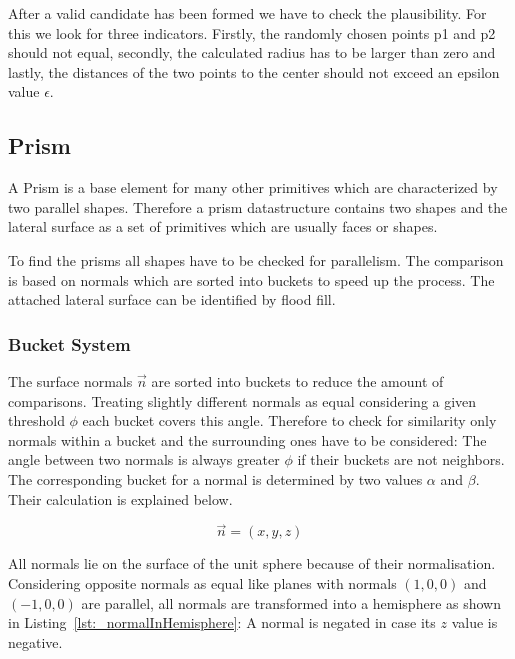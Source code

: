 \documentclass[../ClassicThesis.tex]{subfiles}
\begin{document}
After a valid candidate has been formed we have to check the plausibility. For this we look for three indicators. Firstly, the randomly chosen points p1 and p2 should not equal, secondly, the calculated radius has to be larger than zero and lastly, the distances of the two points to the center should not exceed an epsilon value $\epsilon$.




\subsection{Prism}
\label{ch:classifiers-prism}

A Prism is a base element for many other primitives which are characterized by two parallel shapes. Therefore a prism datastructure contains two shapes and the lateral surface as a set of primitives which are usually faces or shapes.

To find the prisms all shapes have to be checked for parallelism. The comparison is based on normals which are sorted into buckets to speed up the process. The attached lateral surface can be identified by flood fill.

\subsubsection{Bucket System}
\label{sec:PrismBucketSystem}

The surface normals $\vec{n}$ are sorted into buckets to reduce the amount of comparisons. Treating slightly different normals as equal considering a given threshold $\phi$ each bucket covers this angle. Therefore to check for similarity only normals within a bucket and the surrounding ones have to be considered: The angle between two normals is always greater $\phi$ if their buckets are not neighbors. The corresponding bucket for a normal is determined by two values $\alpha$ and $\beta$. Their calculation is explained below.

\begin{equation*}
    \vec{n} = (x, y, z)
\end{equation*}


All normals lie on the surface of the unit sphere because of their normalisation. Considering opposite normals as equal like planes with normals $(1,0,0)$ and $(-1,0,0)$ are parallel, all normals are transformed into a hemisphere as shown in Listing~\ref{lst:_normalInHemisphere}: A normal is negated in case its $z$ value is negative.
\end{document}

